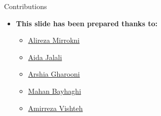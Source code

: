 \documentclass[serif, aspectratio=169]{beamer}
\begin{document}
\begin{frame}{Contributions}
\begin{itemize}
\item \textbf{This slide has been prepared thanks to:}
\begin{itemize}
    \setlength{\itemsep}{10pt} %
    \item \href{https://github.com/alirezamirrokni}{Alireza Mirrokni}
    \item \href{https://github.com/AidaJalali}{Aida Jalali}
    \item \href{https://silentdrift.github.io/}{Arshia Gharooni}
    \item \href{https://github.com/Mahan-Bayhaghi}{Mahan Bayhaghi}
    \item \href{https://github.com/amirrezavishteh}{Amirreza Vishteh}
    
\end{itemize}
\end{itemize}

\end{frame}

\begin{frame}[allowframebreaks]
    
    
    \nocite{*}
\end{frame}
\end{document}
